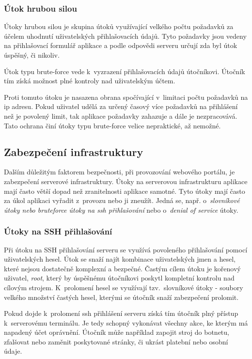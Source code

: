 \subsubsection{Útok hrubou silou}

Útoky hrubou silou\cite{bruteforce} je skupina útoků využívající velkého počtu požadavků za účelem uhodnutí uživatelských přihlašovacích údajů. Tyto požadavky jsou vedeny na přihlašovací formulář aplikace a podle odpovědi serveru určují zda byl útok úspěšný, či nikoliv.

Útok typu brute-force vede k~vyzrazení přihlašovacích údajů útočníkovi. Útočník tím získá možnost plné kontroly nad uživatelským účtem.

Proti tomuto útoku je nasazena obrana spočívající v~limitaci počtu požadavků na \acrshort{ip} adresu. Pokud uživatel udělá za určený časový více požadavků na přihlášení než je povolený limit, tak aplikace požadavky zahazuje a dále je nezpracovává. Tato ochrana činí útoky typu brute-force velice nepraktické, až nemožné.

\subsection{Zabezpečení infrastruktury}

Dalším důležitým faktorem bezpečnosti, při provozování webového portálu, je zabezpečení serverové infrastruktury. Útoky na serverovou infrastrukturu aplikace mají často větší dopad než zranitelnosti aplikace samotné. Tyto útoky mají často za úkol aplikaci vyřadit z~provozu nebo ji zneužít. Jedná se, např. o~\emph{slovníkové útoky nebo bruteforce útoky na \acrshort{ssh} přihlašování} nebo o~\emph{denial of service} útoky.

\subsubsection{Útoky na SSH přihlašování}

Při útoku na SSH přihlašování serveru se využívá povoleného přihlašování pomocí uživatelských hesel. Útok se snaží najít kombinace uživatelských jmen a hesel, které nejsou dostatečně komplexní a bezpečné. Častým cílem útoku je kořenový uživatel, \emph{root}, který by úspěšnému útočníkovi poskytl kompletní kontrolu nad cílovým strojem. K~prolomení hesel se využívají tzv.\ slovníkové útoky - soubory velkého množství častých hesel, kterými se útočník snaží zabezpečení prolomit.

Pokud dojde k~prolomení \acrshort{ssh} přihlášení serveru získá tím útočník plný přístup k~serverovému terminálu. Je tedy schopný vykonávat všechny akce, ke kterým má napadený účet oprávnění. Útočník může například zapojit stroj do botnetu\cite{botnet}, zfalšovat nebo zaměnit poskytované stránky, či ukrást platební nebo osobní údaje.

